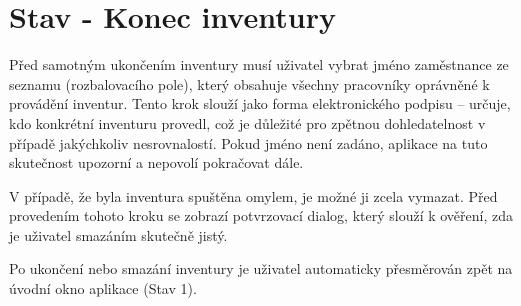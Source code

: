 \section{Stav - Konec inventury}



Před samotným ukončením inventury musí uživatel vybrat jméno zaměstnance ze seznamu (rozbalovacího pole), který obsahuje všechny pracovníky oprávněné k provádění inventur. Tento krok slouží jako forma elektronického podpisu – určuje, kdo konkrétní inventuru provedl, což je důležité pro zpětnou dohledatelnost v případě jakýchkoliv nesrovnalostí. Pokud jméno není zadáno, aplikace na tuto skutečnost upozorní a nepovolí pokračovat dále.

V případě, že byla inventura spuštěna omylem, je možné ji zcela vymazat. Před provedením tohoto kroku se zobrazí potvrzovací dialog, který slouží k ověření, zda je uživatel smazáním skutečně jistý.

Po ukončení nebo smazání inventury je uživatel automaticky přesměrován zpět na úvodní okno aplikace (Stav 1).


